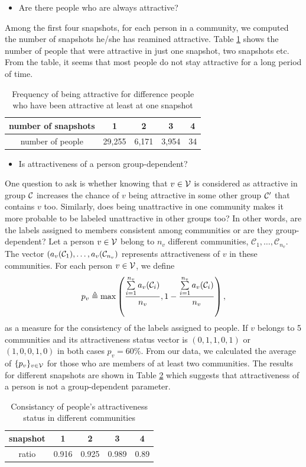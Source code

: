 \begin{itemize}
\item Are there people who are always attractive?
\end{itemize}

Among the first four snapshots, for each person in a community, we computed the number of snapshots
he/she has reamined attractive. Table  \ref{table:all} shows the number of people that were attractive in just one snapshot, two snapshots etc. From the table, it seems that most people do not stay attractive for a long period of time.

\begin{table}[htdp]
\caption{Frequency of being  attractive for difference people who have been attractive at least at one snapshot}
\begin{center}
\begin{tabular}{|c|c|c|c|c|}
\hline
number of snapshots & 1 & 2 & 3 & 4  \\ \hline
number of people  & 29,255 & 6,171 & 3,954 & 34 \\ \hline
\end{tabular}
\end{center}
\label{table:all}
\end{table}%

\begin{itemize}
\item Is attractiveness of a person group-dependent?
\end{itemize}

One question to ask is whether knowing that $v\in\mathcal{V}$ is considered as attractive in  group $\mathcal{C}$ increases the chance of $v$ being attractive in some other group $\mathcal{C}'$ that contains $v$ too.  Similarly, does being unattractive in one community makes it more probable to be labeled unattractive in other groups too? In other words, are  the labels assigned to members consistent among communities or are they group-dependent? Let a person $v\in\mathcal{V}$ belong to $n_v$ different communities, $\mathcal{C}_1,\ldots,\mathcal{C}_{n_v}$. The vector  $(a_v(\mathcal{C}_1),\ldots,a_v(\mathcal{C}_{n_v})$ represents attractiveness of $v$ in these communities. For each person $v\in\mathcal{V}$, we define 
\begin{align}
p_v\triangleq\max\left(\frac{\sum\limits_{i=1}^{n_v} a_v(\mathcal{C}_i)}{n_v},1-\frac{\sum\limits_{i=1}^{n_v} a_v(\mathcal{C}_i)}{n_v}\right),
\end{align}
as a measure for the consistency of the labels assigned to people. If $v$ belongs to 5 communities and its attractiveness status vector is $(0,1,1,0,1)$  or $(1,0,0,1,0)$ in both cases $p_v=60\%$. From our data, we calculated the average of $\{p_v\}_{v\in\mathcal{V}}$ for those who are members of at least two communities.  The results for different snapshots are shown in Table \ref{table:glob} which suggests that attractiveness of a person is not a group-dependent parameter. 

\begin{table}[htdp]
\caption{Consistancy of people's attractiveness status in different communities}
\begin{center}
\begin{tabular}{|c|c|c|c|c|}\hline
snapshot & 1 & 2 & 3 & 4  \\ \hline
ratio  & 0.916 & 0.925 & 0.989 & 0.89 \\ \hline
\end{tabular}
\end{center}
\label{table:glob}
\end{table}%



